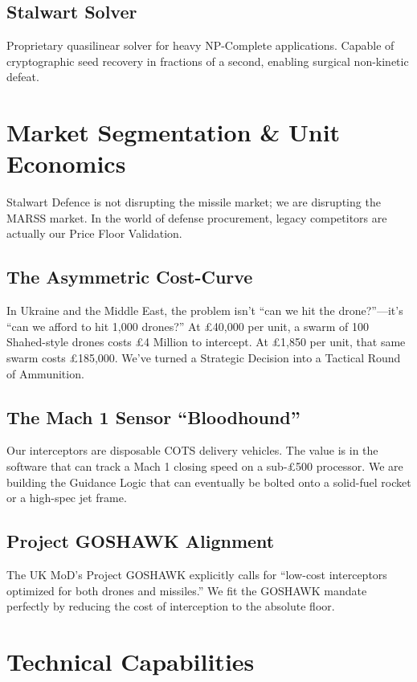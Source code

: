 \documentclass[a4paper,11pt]{article}
\begin{document}
\subsection{Stalwart Solver}
Proprietary quasilinear solver for heavy NP-Complete applications. Capable of cryptographic seed recovery in fractions of a second, enabling surgical non-kinetic defeat.

\section{Market Segmentation \& Unit Economics}

Stalwart Defence is not disrupting the missile market; we are disrupting the MARSS market. In the world of defense procurement, legacy competitors are actually our Price Floor Validation.

\subsection{The Asymmetric Cost-Curve}
In Ukraine and the Middle East, the problem isn't ``can we hit the drone?''---it’s ``can we afford to hit 1,000 drones?'' At £40,000 per unit, a swarm of 100 Shahed-style drones costs £4 Million to intercept. At £1,850 per unit, that same swarm costs £185,000. We've turned a Strategic Decision into a Tactical Round of Ammunition.

\subsection{The Mach 1 Sensor ``Bloodhound''}
Our interceptors are disposable COTS delivery vehicles. The value is in the software that can track a Mach 1 closing speed on a sub-£500 processor. We are building the Guidance Logic that can eventually be bolted onto a solid-fuel rocket or a high-spec jet frame.

\subsection{Project GOSHAWK Alignment}
The UK MoD's Project GOSHAWK explicitly calls for ``low-cost interceptors optimized for both drones and missiles.'' We fit the GOSHAWK mandate perfectly by reducing the cost of interception to the absolute floor.

\section{Technical Capabilities}
\end{document}
